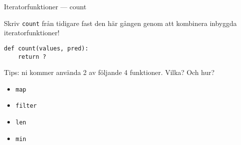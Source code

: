 \documentclass{beamer}
\begin{document}
  \begin{frame}[fragile]{Iteratorfunktioner --- count}

    Skriv \texttt{count} från tidigare fast den här gången genom att kombinera
    inbyggda iteratorfunktioner!

    \begin{lstlisting}
def count(values, pred):
    return ?
    \end{lstlisting}

    \pause{}

    Tips: ni kommer använda 2 av följande 4 funktioner. Vilka? Och hur?

    \begin{itemize}
      \item \texttt{map}
      \item \texttt{filter}
      \item \texttt{len}
      \item \texttt{min}
    \end{itemize}

  \end{frame}

\end{document}
